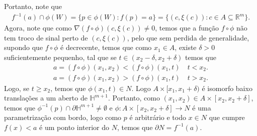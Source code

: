 \begin{homeworkProblem}[Seção 2-3]
\begin{solution}
    Portanto, note que
    \begin{align*}
      f^{-1}(a)\cap \phi(W)=\{p\in \phi(W):f(p)=a\}=\{(c,\xi(c)):c\in A\subseteq\mathbb{R}^{m}\}.
    \end{align*}
    Agora, note que como $\nabla(f\circ\phi)(c,\xi(c))\neq 0$, temos que a função $f\circ\phi$ não tem troco de sinal perto de $(c,\xi(c))$, pelo que sem perdida de generalidade, supondo que $f\circ\phi$ é decrecente, temos que como $x_1\in A$, existe $\delta>0$ suficientemente pequenho, tal que se $t\in(x_2-\delta,x_2+\delta)$ temos que 
    \begin{align*}
      a=(f\circ\phi)(x_1,x_2)<(f\circ\phi)(x_1,t)\quad t<x_2.\\
      a=(f\circ\phi)(x_1,x_2)>(f\circ\phi)(x_1,t)\quad t>x_2.
    \end{align*}
    Logo, se $t\geq x_2$, temos que $\phi(x_1,t)\in N$. Logo $A\times [x_1,x_1+\delta)$ é isomorfo baixo translações a um aberto de $\mathbb{H}^{m+1}$. Portanto, como $(x_1,x_2)\in A\times [x_2,x_2+\delta]$, temos que $\phi^{-1}(p)\cap\partial\mathbb{H}^{m+1}\neq\emptyset$ e $\phi:A\times[x_2,x_2+\delta]\to N$ é uma parametrização com bordo, logo como $p$ é arbitrário e todo $x\in N$ que cumpre $f(x)<a$ é um ponto interior do $N$, temos que $\partial N=f^{-1}(a)$. 
  \end{solution}
\end{homeworkProblem}
